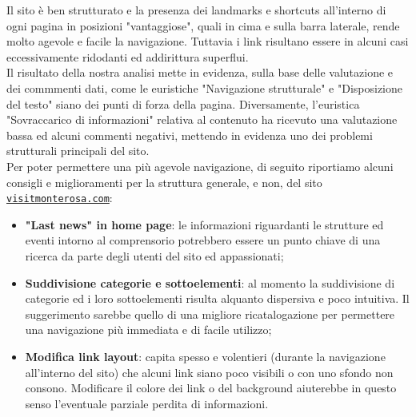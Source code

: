 Il sito è ben strutturato e la presenza dei landmarks e shortcuts all'interno di 
ogni pagina in posizioni "vantaggiose", quali in cima e sulla barra laterale, rende molto
agevole e facile la navigazione. Tuttavia i link risultano essere in alcuni casi
eccessivamente ridodanti ed addirittura superflui.\\
Il risultato della nostra analisi mette in evidenza, sulla base delle
valutazione e dei commmenti dati, come le euristiche "Navigazione strutturale" e
"Disposizione del testo" siano dei punti di forza della pagina. Diversamente, l'euristica
"Sovraccarico di informazioni" relativa al contenuto ha ricevuto una valutazione bassa
ed alcuni commenti negativi, mettendo in evidenza uno dei problemi strutturali
principali del sito.\\
Per poter permettere una più agevole navigazione, di seguito riportiamo alcuni
consigli e miglioramenti per la struttura generale, e non, del sito
\href{https://www.visitmonterosa.com/}{\texttt{visitmonterosa.com}}:
\begin{itemize}
    \item \textbf{"Last news" in home page}: le informazioni riguardanti le
    strutture ed eventi intorno al comprensorio potrebbero essere un punto chiave di una
    ricerca da parte degli utenti del sito ed appassionati;
    \item \textbf{Suddivisione categorie e sottoelementi}: al momento la
    suddivisione di categorie ed i loro sottoelementi risulta alquanto
    dispersiva e poco intuitiva. Il suggerimento sarebbe quello di una
    migliore ricatalogazione per permettere una navigazione più immediata e di
    facile utilizzo;
    \item \textbf{Modifica link layout}: capita spesso e volentieri (durante la
    navigazione all'interno del sito) che alcuni link siano poco visibili o con
    uno sfondo non consono. Modificare il colore dei link o del background
    aiuterebbe in questo senso l'eventuale parziale perdita di informazioni.
\end{itemize}